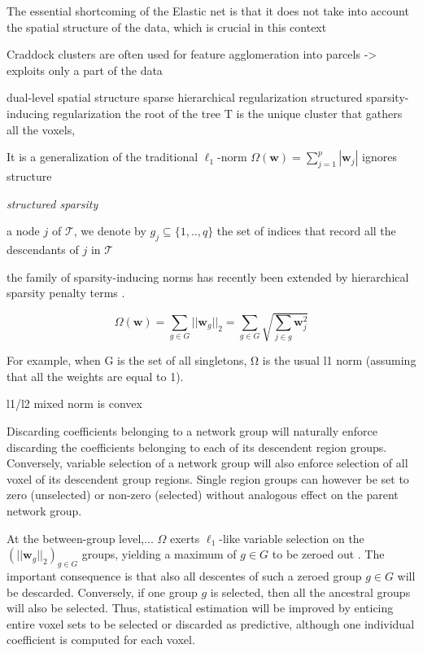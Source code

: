 \documentclass{article} %
\begin{document}
The essential shortcoming of the Elastic net is that
it does not take into account the spatial structure of the data,
which is crucial in this context

Craddock clusters are often used for feature agglomeration
into parcels
-> exploits only a part of the data

dual-level spatial structure
sparse hierarchical regularization
structured sparsity-inducing regularization
the root of the tree T is the unique cluster that gathers all the voxels,

It is a generalization of the traditional $\ell_1$-norm
$\Omega(\mathbf{w}) = \sum_{j=1}^p|\mathbf{w}_j|$
ignores structure


\cite{jenatton2011multi}

\textit{structured sparsity}

\cite{huang2011learning, morales2010family, jenatton2011structured}


a node $j$ of $\mathcal{T}$,
we denote by $g_j \subseteq \{1,..,q\}$ the set of indices that record
all the descendants of $j$ in $\mathcal{T}$

the family of sparsity-inducing norms has recently been extended
by hierarchical sparsity penalty terms
\cite{zhao2009composite}.


\begin{equation}
  \Omega(\mathbf{w}) = \sum_{g \in G}||\mathbf{w}_g||_2 = \sum_{g \in G}\sqrt{\sum_{j \in g}\mathbf{w}_j^2}
\end{equation}

For example, when G is the set of all singletons, Ω is the
usual l1 norm (assuming that all the weights are equal to 1).

l1/l2 mixed norm is convex


Discarding coefficients belonging to a network group will naturally enforce
discarding the coefficients belonging to each of its descendent region groups.
Conversely,
variable selection of a network group will also enforce
selection of all voxel of its descendent group regions.
Single region groups can however be set to zero (unselected)
or non-zero (selected)
without analogous effect on the parent network group.




At the between-group level,...
$\Omega$ exerts $\ell_1$-like variable selection on
the $(||\mathbf{w}_g||_2)_{g\in G}$ groups,
yielding a maximum of $g \in G$ to be zeroed out
\cite{jenatton2011structured}.
The important consequence is that also all descentes of such a zeroed
group $g \in G$ will be descarded.
Conversely,
if one group $g$ is selected,
then all the ancestral groups will also be selected.
Thus, statistical estimation will be improved by enticing
entire voxel sets to be selected or discarded as predictive, 
although one individual coefficient is computed for each voxel.
\end{document}
